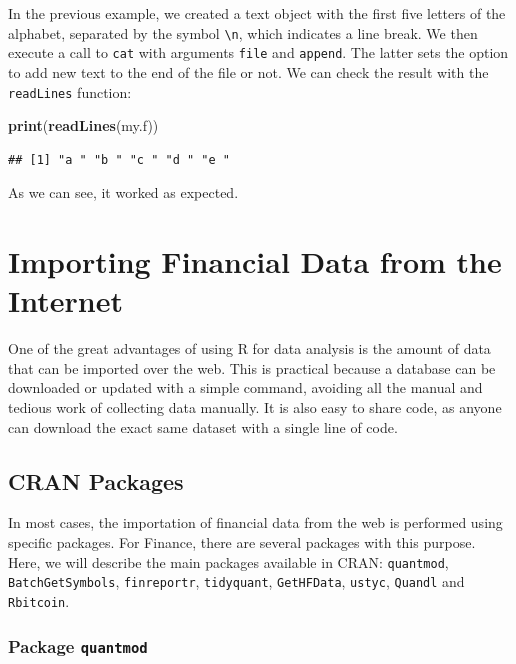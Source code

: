 \documentclass[11pt,]{book}
\newenvironment{Shaded}{\begin{snugshade}}{\end{snugshade}}
\newcommand{\KeywordTok}[1]{\textcolor[rgb]{0.27,0.27,0.27}{\textbf{#1}}}
\newcommand{\NormalTok}[1]{#1}
\begin{document}
In the previous example, we created a text object with the first five
letters of the alphabet, separated by the symbol
\texttt{\textbackslash{}n}, which indicates a line break. We then
execute a call to \texttt{cat} with arguments \texttt{file} and
\texttt{append}. The latter sets the option to add new text to the end
of the file or not. We can check the result with the \texttt{readLines}
function:

\begin{Shaded}
\begin{Highlighting}[]
\KeywordTok{print}\NormalTok{(}\KeywordTok{readLines}\NormalTok{(my.f))}
\end{Highlighting}
\end{Shaded}

\begin{verbatim}
## [1] "a " "b " "c " "d " "e "
\end{verbatim}

As we can see, it worked as expected.

\hypertarget{importingInternet}{\chapter{Importing Financial Data from
the Internet}\label{importingInternet}}

One of the great advantages of using R for data analysis is the amount
of data that can be imported over the web. This is practical because a
database can be downloaded or updated with a simple command, avoiding
all the manual and tedious work of collecting data manually. It is also
easy to share code, as anyone can download the exact same dataset with a
single line of code.

\section{CRAN Packages}\label{cran-packages}

In most cases, the importation of financial data from the web is
performed using specific packages. For Finance, there are several
packages with this purpose. Here, we will describe the main packages
available in CRAN: \texttt{quantmod}, \texttt{BatchGetSymbols},
\texttt{finreportr}, \texttt{tidyquant}, \texttt{GetHFData},
\texttt{ustyc}, \texttt{Quandl} and \texttt{Rbitcoin}.

\subsection{\texorpdfstring{Package
\texttt{quantmod}}{Package quantmod}}\label{package-quantmod}
\end{document}
